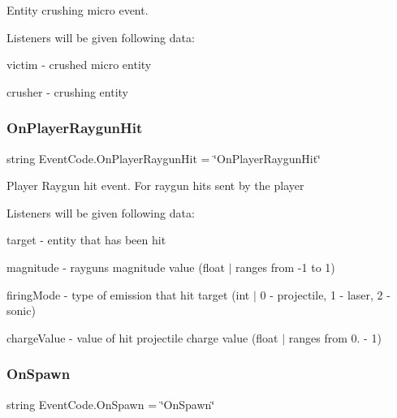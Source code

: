 Entity crushing micro event. 

Listeners will be given following data\+:
\begin{DoxyItemize}
\item {\ttfamily victim} -\/ crushed micro entity
\item {\ttfamily crusher} -\/ crushing entity 
\end{DoxyItemize}\mbox{\label{class_event_code_aaaadd94dd51e82dc133c6e5147e2ede2}} 
\subsubsection{\texorpdfstring{OnPlayerRaygunHit}{OnPlayerRaygunHit}}
{\footnotesize\ttfamily string Event\+Code.\+On\+Player\+Raygun\+Hit = \char`\"{}On\+Player\+Raygun\+Hit\char`\"{}\hspace{0.3cm}{\ttfamily [static]}}



Player Raygun hit event. For raygun hits sent by the player 

Listeners will be given following data\+:
\begin{DoxyItemize}
\item {\ttfamily target} -\/ entity that has been hit
\item {\ttfamily magnitude} -\/ raygun\textquotesingle{}s magnitude value (float $\vert$ ranges from -\/1 to 1)
\item {\ttfamily firing\+Mode} -\/ type of emission that hit target (int $\vert$ 0 -\/ projectile, 1 -\/ laser, 2 -\/ sonic)
\item {\ttfamily charge\+Value} -\/ value of hit projectile charge value (float $\vert$ ranges from 0. -\/ 1) 
\end{DoxyItemize}\mbox{\label{class_event_code_a03a965e04c12fca8491beb8ec3753df4}} 
\subsubsection{\texorpdfstring{OnSpawn}{OnSpawn}}
{\footnotesize\ttfamily string Event\+Code.\+On\+Spawn = \char`\"{}On\+Spawn\char`\"{}\hspace{0.3cm}{\ttfamily [static]}}




